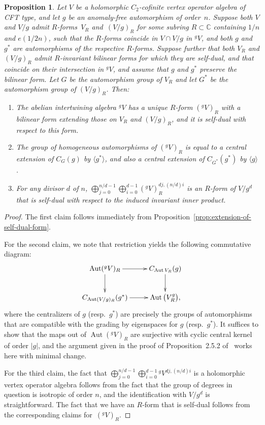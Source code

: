 \documentclass[11pt]{article}
\newcommand{\bC}{\mathbb{C}}
\DeclareMathOperator{\Aut}{Aut}
\newtheorem{prop}[thm]{Proposition}
\theoremstyle{definition}
\begin{document}
\begin{prop} \label{prop:R-form-for-abelian-intertwining-algebra}Let $V$ be a holomorphic $C_2$-cofinite vertex operator algebra of CFT type, and let $g$ be an anomaly-free automorphism of order~$n$. Suppose both $V$ and $V/g$ admit $R$-forms~$V_R$ and~$(V/g)_R$ for some subring $R \subset \bC$ containing $1/n$ and $e(1/2n)$, such that the $R$-forms coincide in $V \cap V/g$ in ${}^gV$, and both $g$ and $g^*$ are automorphisms of the respective $R$-forms. Suppose further that both $V_R$ and $(V/g)_R$ admit $R$-invariant bilinear forms for which they are self-dual, and that coincide on their intersection in ${}^gV$, and assume that $g$ and $g^*$ preserve the bilinear form. Let $G$ be the automorphism group of $V_R$ and let $G^*$ be the automorphism group of $(V/g)_R$. Then:
\begin{enumerate}\itemsep=0pt
\item[$1.$] The abelian intertwining algebra ${}^gV$ has a unique $R$-form $({}^gV)_R$ with a bilinear form extending those on $V_R$ and $(V/g)_R$, and it is self-dual with respect to this form.
\item[$2.$] The group of homogeneous automorphisms of $({}^gV)_R$ is equal to a central extension of $C_G(g)$ by $\langle g^* \rangle$, and also a central extension of $C_{G^*}(g^*)$ by $\langle g \rangle$.
\item[$3.$] For any divisor $d$ of $n$, $\bigoplus_{j=0}^{n/d-1} \bigoplus_{i=0}^{d-1} ({}^gV)_R^{dj,(n/d)i}$ is an $R$-form of $V/g^d$ that is self-dual with respect to the induced invariant inner product.
\end{enumerate}
\end{prop}
\begin{proof}The first claim follows immediately from Proposition~\ref{prop:extension-of-self-dual-form}.

For the second claim, we note that restriction yields the following commutative diagram:
\begin{gather*} \xymatrix{ \Aut({}^gV)_R \ar[r] \ar[d] & C_{\Aut V_R}(g) \ar[d] \\ C_{\Aut (V/g)_R}(g^*) \ar[r] & \Aut \big(V_R^g\big), } \end{gather*}
where the centralizers of $g$ (resp.~$g^*$) are precisely the groups of automorphisms that are compatible with the grading by eigenspaces for $g$ (resp.~$g^*$). It suffices to show that the maps out of $\Aut({}^gV)_R$ are surjective with cyclic central kernel of order $|g|$, and the argument given in the proof of Proposition~2.5.2 of~\cite{GM4} works here with minimal change.

For the third claim, the fact that $\bigoplus_{j=0}^{n/d-1} \bigoplus_{i=0}^{d-1} {}^gV^{dj,(n/d)i}$ is a holomorphic vertex operator algebra follows from the fact that the group of degrees in question is isotropic of order $n$, and the identification with $V/g^d$ is straightforward. The fact that we have an $R$-form that is self-dual follows from the corresponding claims for~$({}^gV)_R$.
\end{proof}
\end{document}
